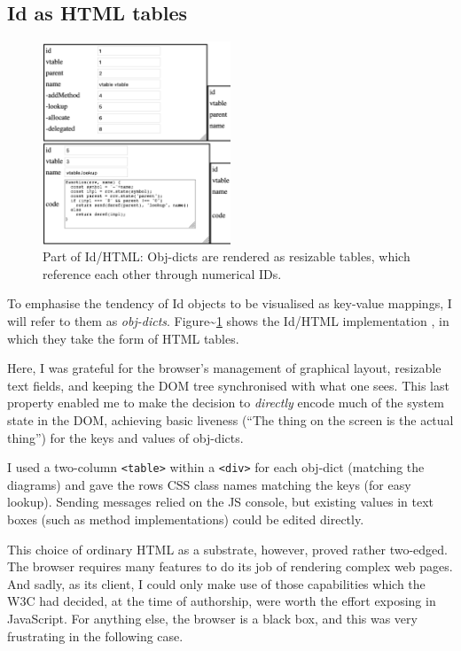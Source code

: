 \hypertarget{id-as-html-tables}{%
\subsection{Id as HTML tables}\label{id-as-html-tables}}

\begin{figure}[h]
  \centering
  \includegraphics[width=0.5\textwidth]{orom-html.png}
  \caption{Part of Id{}/HTML: Obj-dicts are rendered as resizable tables, which reference
           each other through numerical IDs. \label{fig:orom-html}}
\end{figure}

To emphasise the tendency of Id{} objects to be visualised as key-value
mappings, I will refer to them as \emph{obj-dicts}.
Figure\textasciitilde{}\ref{fig:orom-html} shows the Id{}/HTML
implementation \cite{orom-html}, in which they take the form of HTML
tables.

Here, I was grateful for the browser's management of graphical layout,
resizable text fields, and keeping the DOM tree synchronised with what
one sees. This last property enabled me to make the decision to
\emph{directly} encode much of the system state in the DOM, achieving
basic liveness (``The thing on the screen is the actual thing'') for the
keys and values of obj-dicts.

I used a two-column \texttt{\textless{}table\textgreater{}} within a
\texttt{\textless{}div\textgreater{}} for each obj-dict (matching the
diagrams) and gave the rows CSS class names matching the keys (for easy
lookup). Sending messages relied on the JS console, but existing values
in text boxes (such as method implementations) could be edited directly.

This choice of ordinary HTML as a substrate, however, proved rather
two-edged. The browser requires many features to do its job of rendering
complex web pages. And sadly, as its client, I could only make use of
those capabilities which the W3C had decided, at the time of authorship,
were worth the effort exposing in JavaScript. For anything else, the
browser is a black box, and this was very frustrating in the following
case.

